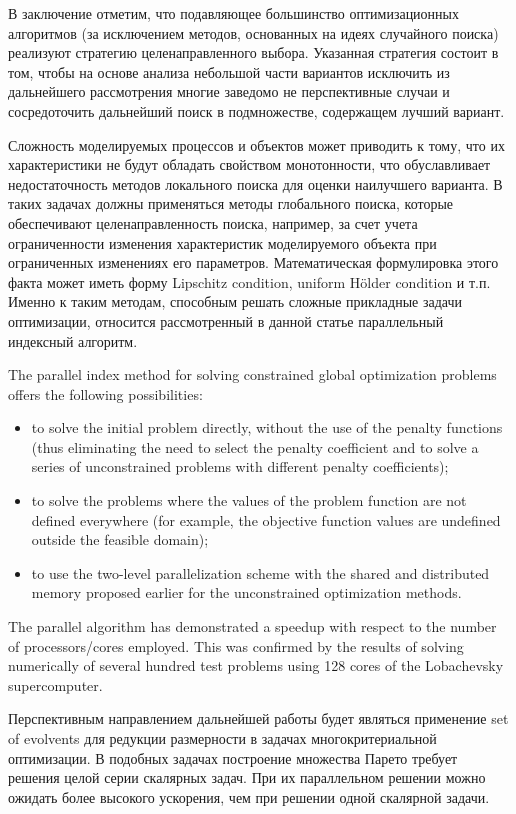 \documentclass[smallextended]{svjour3}       %
\begin{document}
\Russian
В заключение отметим, что подавляющее большинство оптимизационных алгоритмов (за исключением методов, основанных на идеях случайного поиска) реализуют стратегию целенаправленного выбора. Указанная стратегия состоит в том, чтобы на основе анализа небольшой части вариантов исключить из дальнейшего рассмотрения многие заведомо не перспективные случаи и сосредоточить дальнейший поиск в подмножестве, содержащем лучший вариант. 

Сложность моделируемых процессов и объектов может приводить к тому, что их характеристики не будут обладать свойством монотонности, что обуславливает недостаточность методов локального поиска для оценки наилучшего варианта. В таких задачах должны применяться методы глобального поиска, которые обеспечивают целенаправленность поиска, например, за счет учета ограниченности изменения характеристик моделируемого объекта при ограниченных изменениях его параметров. Математическая формулировка этого факта может иметь форму Lipschitz condition, uniform H\"older condition и т.п. Именно к таким методам, способным решать сложные прикладные задачи оптимизации, относится рассмотренный в данной статье параллельный индексный алгоритм. 

The parallel index method for solving constrained global optimization problems %
offers the following possibilities:
\begin{itemize}
	\item to solve the initial problem directly, without the use of the penalty functions (thus eliminating the need to select the penalty coefficient and to solve a series of unconstrained problems with different penalty coefficients);
	\item to solve the problems where the values of the problem function are not defined everywhere (for example, the objective function values are undefined outside the feasible domain);
	\item to use the two-level parallelization scheme with the shared and distributed memory proposed earlier for the unconstrained optimization methods.
\end{itemize}

The parallel algorithm has demonstrated a speedup with respect to the number of processors/cores employed. This was confirmed by the results of solving numerically of several hundred test problems using 128 cores of the Lobachevsky supercomputer. 

\Russian
Перспективным направлением дальнейшей работы будет являться применение set of evolvents для редукции размерности в задачах многокритериальной оптимизации. В подобных задачах построение множества Парето требует решения целой серии скалярных задач. При их параллельном решении можно ожидать более высокого ускорения, чем при решении одной скалярной задачи.
\end{document}
